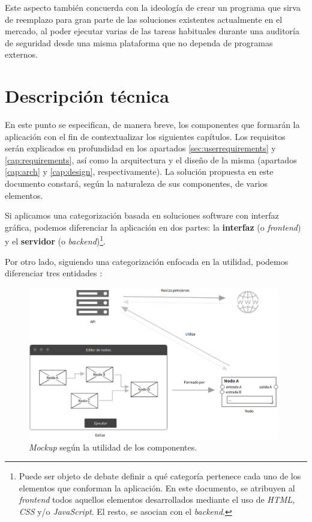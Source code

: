 Este aspecto también concuerda con la ideología de crear un programa que sirva de reemplazo para gran parte de las soluciones existentes actualmente en el mercado, al poder ejecutar varias de las tareas habituales durante una auditoría de seguridad desde una misma plataforma que no dependa de programas externos.\n


\section{Descripción técnica} \label{sec:desctecnica}

En este punto se especifican, de manera breve, los componentes que formarán la aplicación con el fin de contextualizar los siguientes capítulos. Los requisitos serán explicados en profundidad en los apartados \ref{sec:userrequirements} y \ref{cap:requirements}, así como la arquitectura y el diseño de la misma (apartados \ref{cap:arch} y \ref{cap:design}, respectivamente). La solución propuesta en este documento constará, según la naturaleza de sus componentes, de varios elementos.\sn

Si aplicamos una categorización basada en soluciones software con interfaz gráfica, podemos diferenciar la aplicación en dos partes: la \textbf{interfaz} (o \textit{frontend}) y el \textbf{servidor} (o \textit{backend})\footnote{Puede ser objeto de debate definir a qué categoría pertenece cada uno de los elementos que conforman la aplicación. En este documento, se atribuyen al \textit{frontend} todos aquellos elementos desarrollados mediante el uso de \textit{HTML}, \textit{CSS} y/o \textit{JavaScript}. El resto, se asocian con el \textit{backend}.}.\sn
 
Por otro lado, siguiendo una categorización enfocada en la utilidad, podemos diferenciar tres entidades :\sn

\begin{figure}[H]
    \centering
    \includegraphics[width=11cm]{img/tables/05_Mockup-Utility.png}
    \caption{\textit{Mockup} según la utilidad de los componentes.}
    \label{fig:mockuputility}
\end{figure}


